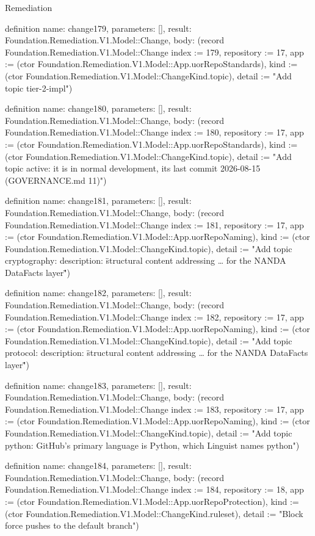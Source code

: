 \begin{lexlean}{Remediation}
\begin{semanticmodule}
definition{
  name: change179,
  parameters: [],
  result: Foundation.Remediation.V1.Model::Change,
  body: (record Foundation.Remediation.V1.Model::Change {index := 179, repository := 17, app := (ctor Foundation.Remediation.V1.Model::App.uorRepoStandards), kind := (ctor Foundation.Remediation.V1.Model::ChangeKind.topic), detail := "Add topic tier-2-impl"})
}

definition{
  name: change180,
  parameters: [],
  result: Foundation.Remediation.V1.Model::Change,
  body: (record Foundation.Remediation.V1.Model::Change {index := 180, repository := 17, app := (ctor Foundation.Remediation.V1.Model::App.uorRepoStandards), kind := (ctor Foundation.Remediation.V1.Model::ChangeKind.topic), detail := "Add topic active: it is in normal development, its last commit 2026-08-15 (GOVERNANCE.md 11)"})
}

definition{
  name: change181,
  parameters: [],
  result: Foundation.Remediation.V1.Model::Change,
  body: (record Foundation.Remediation.V1.Model::Change {index := 181, repository := 17, app := (ctor Foundation.Remediation.V1.Model::App.uorRepoNaming), kind := (ctor Foundation.Remediation.V1.Model::ChangeKind.topic), detail := "Add topic cryptography: description: \"structural content addressing … for the NANDA DataFacts layer\""})
}

definition{
  name: change182,
  parameters: [],
  result: Foundation.Remediation.V1.Model::Change,
  body: (record Foundation.Remediation.V1.Model::Change {index := 182, repository := 17, app := (ctor Foundation.Remediation.V1.Model::App.uorRepoNaming), kind := (ctor Foundation.Remediation.V1.Model::ChangeKind.topic), detail := "Add topic protocol: description: \"structural content addressing … for the NANDA DataFacts layer\""})
}

definition{
  name: change183,
  parameters: [],
  result: Foundation.Remediation.V1.Model::Change,
  body: (record Foundation.Remediation.V1.Model::Change {index := 183, repository := 17, app := (ctor Foundation.Remediation.V1.Model::App.uorRepoNaming), kind := (ctor Foundation.Remediation.V1.Model::ChangeKind.topic), detail := "Add topic python: GitHub's primary language is Python, which Linguist names python"})
}

definition{
  name: change184,
  parameters: [],
  result: Foundation.Remediation.V1.Model::Change,
  body: (record Foundation.Remediation.V1.Model::Change {index := 184, repository := 18, app := (ctor Foundation.Remediation.V1.Model::App.uorRepoProtection), kind := (ctor Foundation.Remediation.V1.Model::ChangeKind.ruleset), detail := "Block force pushes to the default branch"})
}


\end{semanticmodule}
\end{lexlean}
